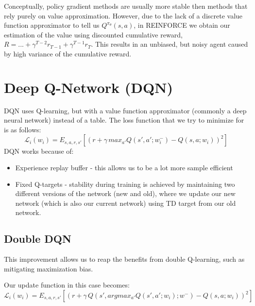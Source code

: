 \documentclass[11pt]{article} %
\begin{document}
Conceptually, policy gradient methods are usually more stable then methods that rely purely on value approximation. However, due to the lack of a discrete value function approximator to tell us $Q^{\pi_\theta}(s,a)$, in REINFORCE we obtain our estimation of the value using discounted cumulative reward, $R = ...+\gamma^{T-2} r_{T-1} + \gamma^{T-1} r_T$. This results in an unbiased, but noisy agent caused by high variance of the cumulative reward. 


\section{Deep Q-Network (DQN)}
DQN uses Q-learning, but with a value function approximator (commonly a deep neural network) instead of a table. The loss function that we try to minimize for is as follows:
\begin{equation*}
    \mathcal{L}_i(w_i) = E_{s, a, r, s'}[(r + \gamma\,max_{a'}Q(s', a'; w_i^-) - Q(s, a; w_i))^2]
\end{equation*}
DQN works because of:
\begin{itemize}
    \item Experience replay buffer - this allows us to be a lot more sample efficient 
    \item Fixed Q-targets - stability during training is achieved by maintaining two different versions of the network (new and old), where we update our new network (which is also our current network) using TD target from our old network. 
\end{itemize}
\subsection{Double DQN}
This improvement allows us to reap the benefits from double Q-learning, such as mitigating maximization bias.

Our update function in this case becomes:
\begin{equation*}
    \mathcal{L}_i(w_i) = E_{s, a, r, s'}[(r + \gamma\,Q(s', argmax_{a'}Q(s', a'; w_i); w^-) - Q(s, a; w_i))^2]
\end{equation*}
\end{document}
